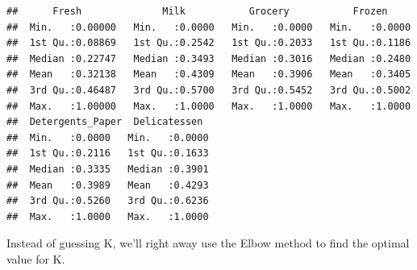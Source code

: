 \documentclass[]{article}
\newenvironment{Shaded}{\begin{snugshade}}{\end{snugshade}}
\newcommand{\KeywordTok}[1]{\textcolor[rgb]{0.13,0.29,0.53}{\textbf{#1}}}
\newcommand{\DataTypeTok}[1]{\textcolor[rgb]{0.13,0.29,0.53}{#1}}
\newcommand{\DecValTok}[1]{\textcolor[rgb]{0.00,0.00,0.81}{#1}}
\newcommand{\StringTok}[1]{\textcolor[rgb]{0.31,0.60,0.02}{#1}}
\newcommand{\CommentTok}[1]{\textcolor[rgb]{0.56,0.35,0.01}{\textit{#1}}}
\newcommand{\ControlFlowTok}[1]{\textcolor[rgb]{0.13,0.29,0.53}{\textbf{#1}}}
\newcommand{\OperatorTok}[1]{\textcolor[rgb]{0.81,0.36,0.00}{\textbf{#1}}}
\newcommand{\NormalTok}[1]{#1}
\begin{document}
\begin{verbatim}
##      Fresh              Milk           Grocery           Frozen      
##  Min.   :0.00000   Min.   :0.0000   Min.   :0.0000   Min.   :0.0000  
##  1st Qu.:0.08869   1st Qu.:0.2542   1st Qu.:0.2033   1st Qu.:0.1186  
##  Median :0.22747   Median :0.3493   Median :0.3016   Median :0.2480  
##  Mean   :0.32138   Mean   :0.4309   Mean   :0.3906   Mean   :0.3405  
##  3rd Qu.:0.46487   3rd Qu.:0.5700   3rd Qu.:0.5452   3rd Qu.:0.5002  
##  Max.   :1.00000   Max.   :1.0000   Max.   :1.0000   Max.   :1.0000  
##  Detergents_Paper  Delicatessen   
##  Min.   :0.0000   Min.   :0.0000  
##  1st Qu.:0.2116   1st Qu.:0.1633  
##  Median :0.3335   Median :0.3901  
##  Mean   :0.3989   Mean   :0.4293  
##  3rd Qu.:0.5260   3rd Qu.:0.6236  
##  Max.   :1.0000   Max.   :1.0000
\end{verbatim}

Instead of guessing K, we'll right away use the Elbow method to find the
optimal value for K.

\begin{Shaded}
\end{Shaded}
\end{document}
